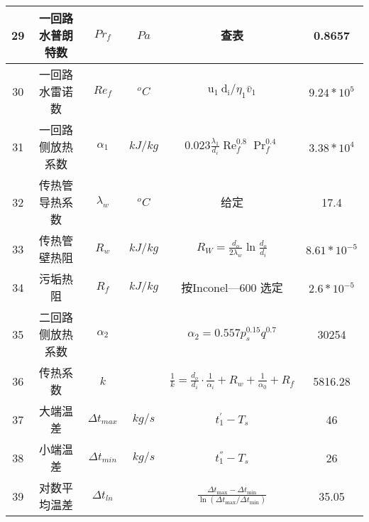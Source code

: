 \begin{table}[H]
{\begin{tabular}{|c|c|c|c|c|c|}
            29   & 一回路水普朗特数 & $ Pr_f $            & $ Pa $    & 查表                                                                                               & 0.8657           \\ \hline
            30   & 一回路水雷诺数   & $ Re_f $            & $ ^oC $   & $ \mathrm{u}_{1} \mathrm{~d}_{\mathrm{i}} / \eta_{1} \bar{v}_{1} $                                 & $ 9.24*10^{5} $  \\ \hline
            31   & 一回路侧放热系数 & $ \alpha_1 $        & $ kJ/kg $ & $ 0.023 \frac{\lambda_{1}}{d_{i}} \operatorname{Re}_{f}^{0.8} \operatorname{Pr}_{f}^{0.4} $        & $ 3.38*10^{4} $  \\ \hline
            32   & 传热管导热系数   & $ \lambda_w $       & $ ^oC $   & 给定                                                                                               & 17.4             \\ \hline
            33   & 传热管壁热阻     & $ R_w $             & $ kJ/kg $ & $ R_{W}=\frac{d_{o}}{2 \lambda_{w}} \ln \frac{d_{o}}{d_{i}} $                                      & $ 8.61*10^{-5} $ \\ \hline
            34   & 污垢热阻         & $ R_f $             & $ kJ/kg $ & 按Inconel—600 选定                                                                                 & $ 2.6*10^{-5} $  \\ \hline
            35   & 二回路侧放热系数 & $ \alpha_2 $        &           & $ \alpha_{2}=0.557 p_{s}^{0.15} q^{0.7} $                                                          & 30254            \\ \hline
            36   & 传热系数         & $ k $               &           & $ \frac{1}{k}=\frac{d_{o}}{d_{i}} \cdot \frac{1}{\alpha_{i}}+R_{w}+\frac{1}{\alpha_{0}}+R_{f} $    & 5816.28          \\ \hline
            37   & 大端温差         & $ \Delta t_{max} $  & $ kg/s $  & $ t_{1}^{'} - T_s $                                                                                & 46               \\ \hline
            38   & 小端温差         & $ \Delta t_{min} $  & $ kg/s $  & $ t_{1}^{''} - T_s $                                                                               & 26               \\ \hline
            39   & 对数平均温差     & $ \Delta t_{ln} $   &           & $ \frac{\Delta t_{\max }-\Delta t_{\min }}{\ln \left(\Delta t_{\max } / \Delta t_{\min }\right)} $ & 35.05            \\ \hline

\end{tabular}}
\end{table}

